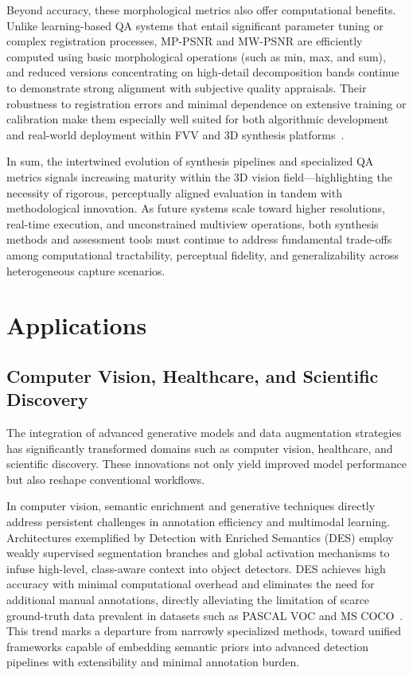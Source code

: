 Beyond accuracy, these morphological metrics also offer computational benefits. Unlike learning-based QA systems that entail significant parameter tuning or complex registration processes, MP-PSNR and MW-PSNR are efficiently computed using basic morphological operations (such as min, max, and sum), and reduced versions concentrating on high-detail decomposition bands continue to demonstrate strong alignment with subjective quality appraisals. Their robustness to registration errors and minimal dependence on extensive training or calibration make them especially well suited for both algorithmic development and real-world deployment within FVV and 3D synthesis platforms~\cite{refQARef99}.

In sum, the intertwined evolution of synthesis pipelines and specialized QA metrics signals increasing maturity within the 3D vision field—highlighting the necessity of rigorous, perceptually aligned evaluation in tandem with methodological innovation. As future systems scale toward higher resolutions, real-time execution, and unconstrained multiview operations, both synthesis methods and assessment tools must continue to address fundamental trade-offs among computational tractability, perceptual fidelity, and generalizability across heterogeneous capture scenarios.

\section{Applications}

\subsection{Computer Vision, Healthcare, and Scientific Discovery}

The integration of advanced generative models and data augmentation strategies has significantly transformed domains such as computer vision, healthcare, and scientific discovery. These innovations not only yield improved model performance but also reshape conventional workflows.

In computer vision, semantic enrichment and generative techniques directly address persistent challenges in annotation efficiency and multimodal learning. Architectures exemplified by Detection with Enriched Semantics (DES) employ weakly supervised segmentation branches and global activation mechanisms to infuse high-level, class-aware context into object detectors. DES achieves high accuracy with minimal computational overhead and eliminates the need for additional manual annotations, directly alleviating the limitation of scarce ground-truth data prevalent in datasets such as PASCAL VOC and MS COCO~\cite{ref61}. This trend marks a departure from narrowly specialized methods, toward unified frameworks capable of embedding semantic priors into advanced detection pipelines with extensibility and minimal annotation burden.

